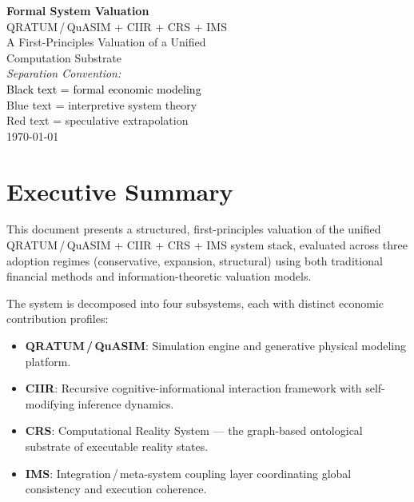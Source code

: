 \documentclass[11pt,a4paper]{article}
\theoremstyle{remark}
\newcommand{\formal}[1]{\textcolor{black}{#1}}
\newcommand{\interpretive}[1]{\textcolor{blue!70!black}{#1}}
\newcommand{\speculative}[1]{\textcolor{red!70!black}{#1}}
\begin{document}
\begin{center}
{\LARGE\bfseries Formal System Valuation}\\[0.4cm]
{\Large QRATUM\,/\,QuASIM + CIIR + CRS + IMS}\\[0.6cm]
{\large A First-Principles Valuation of a Unified\\
Computation Substrate}\\[1.5cm]
{\normalsize
\textit{Separation Convention:}\\[0.3em]
\formal{Black text = formal economic modeling}\\
\interpretive{Blue text = interpretive system theory}\\
\speculative{Red text = speculative extrapolation}
}\\[1cm]
{\large\today}
\end{center}

\vspace{1cm}

\tableofcontents
\newpage

\section{Executive Summary}
\label{sec:executive}

This document presents a structured, first-principles valuation of
the unified QRATUM\,/\,QuASIM + CIIR + CRS + IMS system stack,
evaluated across three adoption regimes (conservative, expansion,
structural) using both traditional financial methods and
information-theoretic valuation models.

The system is decomposed into four subsystems, each with distinct
economic contribution profiles:
\begin{itemize}[nosep]
  \item \textbf{QRATUM\,/\,QuASIM}: Simulation engine and generative
        physical modeling platform.
  \item \textbf{CIIR}: Recursive cognitive-informational interaction
        framework with self-modifying inference dynamics.
  \item \textbf{CRS}: Computational Reality System --- the
        graph-based ontological substrate of executable reality states.
  \item \textbf{IMS}: Integration\,/\,meta-system coupling layer
        coordinating global consistency and execution coherence.
\end{itemize}
\end{document}
